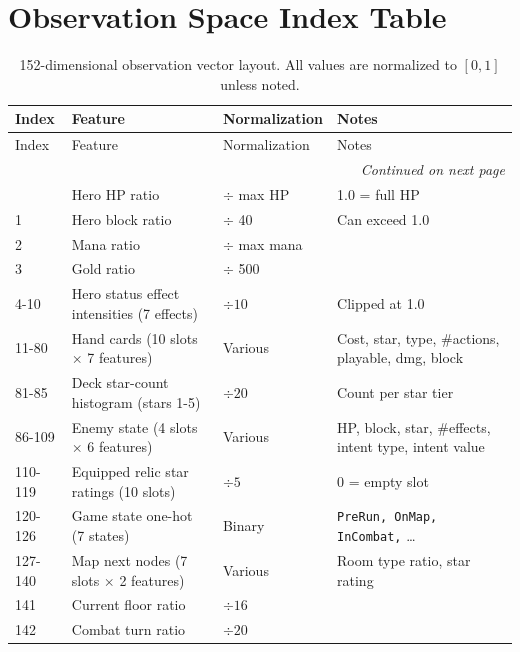 \section*{Observation Space Index Table}
\label{app:obs}

{\small
\begin{longtable}{p{1.8cm}p{4.5cm}p{2.5cm}p{3.5cm}}
    \caption{152-dimensional observation vector layout. All values are normalized to $[0, 1]$ unless noted.}
    \label{tab:obs_space_appendix}\\
    \toprule
    Index & Feature & Normalization & Notes \\
    \midrule
    \endfirsthead
    \toprule
    Index & Feature & Normalization & Notes \\
    \midrule
    \endhead
    \midrule
    \multicolumn{4}{r}{\textit{Continued on next page}}\\
    \endfoot
    \bottomrule
    \endlastfoot
    0     & Hero HP ratio             & $\div$ max HP           & 1.0 = full HP \\
    1     & Hero block ratio          & $\div$ 40               & Can exceed 1.0 \\
    2     & Mana ratio                & $\div$ max mana         & \\
    3     & Gold ratio                & $\div$ 500              & \\
    4-10  & Hero status effect intensities (7 effects) & $\div 10$ & Clipped at 1.0 \\
    11-80 & Hand cards (10 slots $\times$ 7 features) & Various & Cost, star, type, \#actions, playable, dmg, block \\
    81-85 & Deck star-count histogram (stars 1-5) & $\div 20$ & Count per star tier \\
    86-109 & Enemy state (4 slots $\times$ 6 features) & Various & HP, block, star, \#effects, intent type, intent value \\
    110-119 & Equipped relic star ratings (10 slots) & $\div 5$ & 0 = empty slot \\
    120-126 & Game state one-hot (7 states) & Binary & \texttt{PreRun, OnMap, InCombat,} \ldots \\
    127-140 & Map next nodes (7 slots $\times$ 2 features) & Various & Room type ratio, star rating \\
    141   & Current floor ratio       & $\div 16$               & \\
    142   & Combat turn ratio         & $\div 20$               & \\

\end{longtable}}
